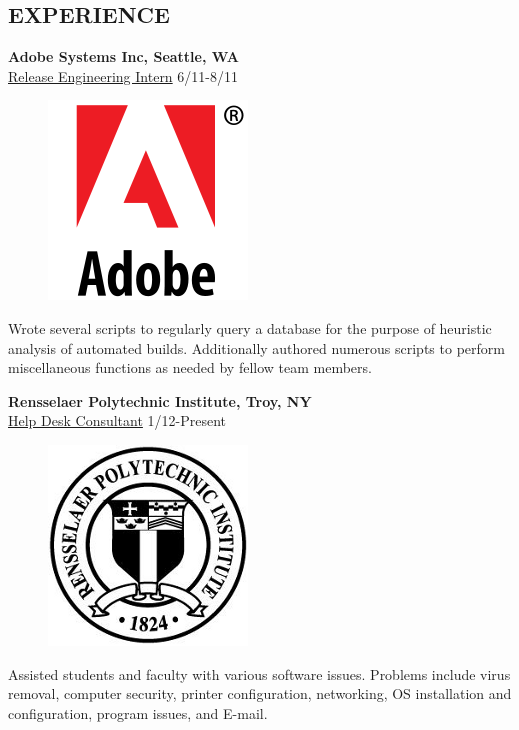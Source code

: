 \documentclass[margin,11pt]{res} %
\begin{document}
\begin{resume}
\section{EXPERIENCE}     {\bf Adobe Systems Inc, Seattle, WA}  \\
                  \underline{Release Engineering Intern} \hfill 6/11-8/11

\begin{figure} %
\centering
\hspace{-1in}\includegraphics[scale=0.15]{adobe.png}
\end{figure}
              Wrote several scripts to regularly query a database for the purpose of heuristic analysis of automated builds. Additionally authored numerous scripts to perform miscellaneous functions as needed by fellow team members.      

                {\bf Rensselaer Polytechnic Institute, Troy, NY} \\
                  \underline{Help Desk Consultant} \hfill 1/12-Present

\begin{figure}
\centering
\hspace{-0.9in}\includegraphics[scale=0.25]{rpi.png}
\end{figure}
                Assisted students and faculty with various software issues. Problems include virus removal, computer security, printer configuration, networking, OS installation and configuration, program issues, and E-mail.
\end{resume} 
\end{document}
